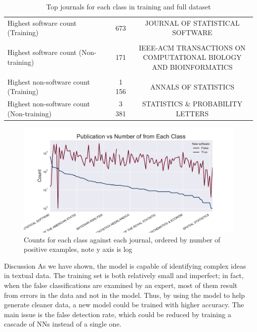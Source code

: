 \documentclass[final]{beamer}
\newlength{\onecolwid}
\begin{document}
\begin{frame}{}
\begin{columns}[t]
\begin{column}{\onecolwid}
\begin{block}{}
\end{block}
\begin{block}{}
	\begin{table}
		\vspace{2ex}
		\begin{tabular}{l cc}
			\toprule
			Highest software count (Training)  &673&	JOURNAL OF STATISTICAL SOFTWARE\\
			& &\\
			Highest software count (Non-training)&171&	\pbox{20cm}{IEEE-ACM TRANSACTIONS ON \\COMPUTATIONAL BIOLOGY\\ AND BIOINFORMATICS}\\
			& &\\
			Highest non-software count (Training) & 1 156 & ANNALS OF STATISTICS\\
			Highest non-software count (Non-training) &3 381& STATISTICS \& PROBABILITY LETTERS\\
			\bottomrule
		\end{tabular}
		\caption{Top journals for each class in training and full dataset}
		\end{table}
	
\begin{figure}
	\includegraphics[width=0.9\linewidth]{countvpub.pdf}
	\caption{Counts for each class against each journal, ordered by number of positive examples, note y axis is log}
\end{figure}

\end{block}

\begin{alertblock}{Discussion}
	\justifying
	As we have shown, the model is capable of identifying complex ideas in textual data. The training set is both relatively small and imperfect; in fact, when the false classifications are examined by an expert, most of them result from errors in the data and not in the model. Thus, by using the model to help generate  cleaner data, a new model could be trained with higher accuracy. The main issue is the false detection rate, which could be reduced by training a cascade of NNs instead of a single one. 
	

\end{alertblock}
\end{column}
\end{columns}
\end{frame}
\end{document}
